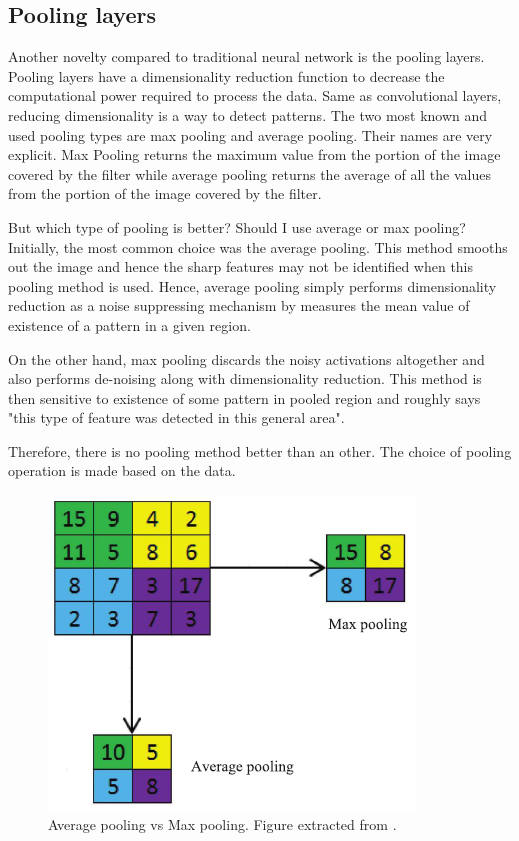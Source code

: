 \documentclass[11pt, openany]{report}
\theoremstyle{plain}
\theoremstyle{definition}
\theoremstyle{remark}
\begin{document}
\subsection{Pooling layers} \label{sec:pooling-layers}
Another novelty compared to traditional neural network is the pooling layers. Pooling layers have a dimensionality reduction function to decrease the computational power required to process the data. Same as convolutional layers, reducing dimensionality is a way to detect patterns. The two most known and used pooling types are max pooling and average pooling. Their names are very explicit. Max Pooling returns the maximum value from the portion of the image covered by the filter while average pooling returns the average of all the values from the portion of the image covered by the filter. 

But which type of pooling is better? Should I use average or max pooling? Initially, the most common choice was the average pooling. This method smooths out the image and hence the sharp features may not be identified when this pooling method is used. Hence, average pooling simply performs dimensionality reduction as a noise suppressing mechanism by measures the mean value of existence of a pattern in a given region. 

On the other hand, max pooling discards the noisy activations altogether and also performs de-noising along with dimensionality reduction. This method is then sensitive to existence of some pattern in pooled region and roughly says "this type of feature was detected in this general area".

Therefore, there is no pooling method better than an other. The choice of pooling operation is made based on the data.  

\begin{figure}[h]
  \centering
  \includegraphics[scale=0.7]{figures/averageVSmaxPOOLING.png}
  \caption{Average pooling vs Max pooling. Figure extracted from \citep{CNN-1}.}
  \label{fig:avgVSmaxPOOLING}
\end{figure}
\end{document}

